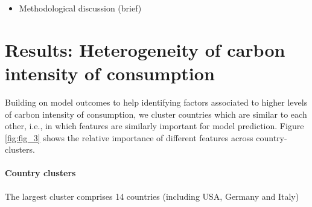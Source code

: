 \documentclass[12pt, a4paper]{article}
\begin{document}
\begin{itemize}
    \item Methodological discussion (brief)
\end{itemize}

\clearpage

\section{Results: Heterogeneity of carbon intensity of consumption} \label{sec:results}

Building on model outcomes to help identifying factors associated to higher levels of carbon intensity of consumption, we cluster countries which are similar to each other, i.e., in which features are similarly important for model prediction. Figure \ref{fig:fig_3} shows the relative importance of different features across country-clusters. 


\paragraph{Country clusters}


The largest cluster comprises 14 countries (including USA, Germany and Italy)
\end{document}

